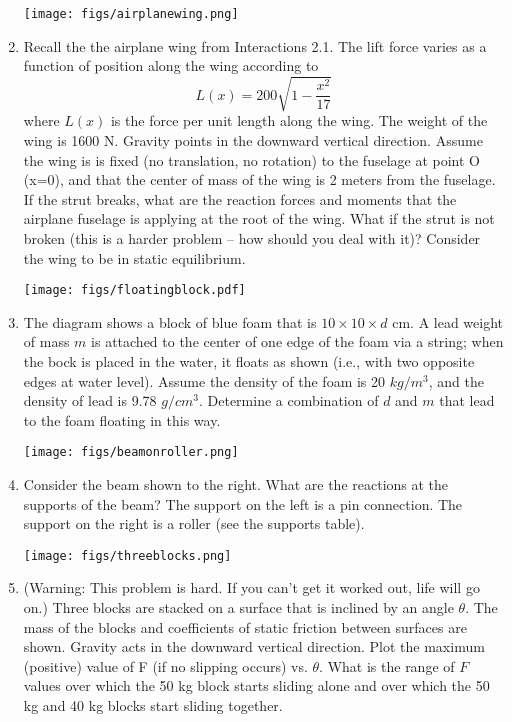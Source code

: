 \documentclass{tufte-handout}
\begin{document}
\begin{enumerate}[resume]
\vfill


 

 \begin{marginfigure} 
\texttt{[image: figs/airplanewing.png]}
\end{marginfigure}
\item Recall the the airplane wing from Interactions 2.1. The lift force varies as a function of position along the wing according to 
$$L(x) = 200 \sqrt{ 1-\frac{x^2}{17}}$$
where $L(x)$ is the force per unit length along the wing. The weight of the wing is 1600 N. Gravity points in the downward vertical direction.  Assume the wing is is fixed (no translation, no rotation) to the fuselage at point O (x=0), and that the center of mass of the wing is 2 meters from the fuselage. If the strut breaks, what are the reaction forces and moments that the airplane fuselage is applying at the root of the wing. What if the strut is not broken (this is a harder problem -- how should you deal with it)?  Consider the wing to be in static equilibrium. 


\clearpage
 \begin{marginfigure} 
\texttt{[image: figs/floatingblock.pdf]}
\end{marginfigure}

\item The diagram shows a block of blue foam that is $10 \times 10 \times d$ cm.  A lead weight of mass $m$ is attached to the center of one edge of the foam via a string; when the bock is placed in the water, it floats as shown (i.e., with two opposite edges at water level).   Assume the density of the foam is 20 $kg/m^3$, and the density of lead is 9.78 $g/cm^3$.  Determine a combination of $d$ and $m$ that lead to the foam floating in this way.

\vfill

\begin{marginfigure} 
\texttt{[image: figs/beamonroller.png]}
\end{marginfigure}

\item Consider the beam shown to the right.  What are the reactions at the supports of the beam? The support on the left is a pin connection. The support on the right is a roller (see the supports table). 
 
 \vfill
 \clearpage
 
 \begin{marginfigure} 
\texttt{[image: figs/threeblocks.png]}
\end{marginfigure}
\item (Warning: This problem is hard.  If you can't get it worked out, life will go on.) Three blocks are stacked on a surface that is inclined by an angle $\theta$. The mass of the blocks and coefficients of static friction between surfaces are shown. Gravity acts in the downward vertical direction. Plot the maximum (positive) value of F (if no slipping occurs) vs. $\theta$. What is the range of $F$ values over which the 50 kg block starts sliding alone and over which the 50 kg and 40 kg blocks start sliding together. 
 

\end{enumerate}
\end{document}
